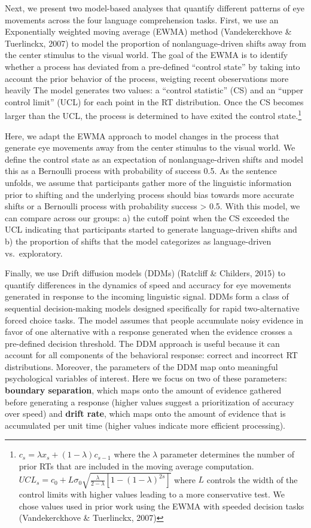 \documentclass[10pt, letterpaper]{article}
\begin{document}
Next, we present two model-based analyses that quantify different
patterns of eye movements across the four language comprehension tasks.
First, we use an Exponentially weighted moving average (EWMA) method
(Vandekerckhove \& Tuerlinckx, 2007) to model the proportion of
nonlanguage-driven shifts away from the center stimulus to the visual
world. The goal of the EWMA is to identify whether a process has
deviated from a pre-defined ``control state'' by taking into account the
prior behavior of the process, weigting recent obeservations more
heavily The model generates two values: a ``control statistic'' (CS) and
an ``upper control limit'' (UCL) for each point in the RT distribution.
Once the CS becomes larger than the UCL, the process is determined to
have exited the control state.\footnote{\(c_s = \lambda x_s + (1-\lambda)c_{s-1}\)
  where the \(\lambda\) parameter determines the number of prior RTs
  that are included in the moving average computation.
  \(UCL_s = c_0 + L\sigma_0\sqrt{\frac{\lambda}{2-\lambda}[1-(1-\lambda)^{2s}]}\)
  where \(L\) controls the width of the control limits with higher
  values leading to a more conservative test. We chose values used in
  prior work using the EWMA with speeded decision tasks (Vandekerckhove
  \& Tuerlinckx, 2007)}

Here, we adapt the EWMA approach to model changes in the process that
generate eye movements away from the center stimulus to the visual
world. We define the control state as an expectation of
nonlanguage-driven shifts and model this as a Bernoulli process with
probability of success 0.5. As the sentence unfolds, we assume that
participants gather more of the linguistic information prior to shifting
and the underlying process should bias towards more accurate shifts or a
Bernoulli process with probability success \textgreater{} 0.5. With this
model, we can compare across our groups: a) the cutoff point when the CS
exceeded the UCL indicating that participants started to generate
language-driven shifts and b) the proportion of shifts that the model
categorizes as language-driven vs.~exploratory.

Finally, we use Drift diffusion models (DDMs) (Ratcliff \& Childers,
2015) to quantify differences in the dynamics of speed and accuracy for
eye movements generated in response to the incoming linguistic signal.
DDMs form a class of sequential decision-making models designed
specifically for rapid two-alternative forced choice tasks. The model
assumes that people accumulate noisy evidence in favor of one
alternative with a response generated when the evidence crosses a
pre-defined decision threshold. The DDM approach is useful because it
can account for all components of the behavioral response: correct and
incorrect RT distributions. Moreover, the parameters of the DDM map onto
meaningful psychological variables of interest. Here we focus on two of
these parameters: \textbf{boundary separation}, which maps onto the
amount of evidence gathered before generating a response (higher values
suggest a prioritization of accuracy over speed) and \textbf{drift
rate}, which maps onto the amount of evidence that is accumulated per
unit time (higher values indicate more efficient processing).
\end{document}
